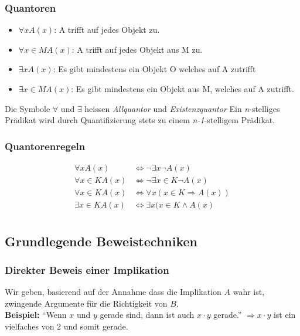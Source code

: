 \subsubsection{Quantoren}
\begin{minipage}{0.9\linewidth}
\begin{itemize}
 \item $\forall xA (x)$: A trifft auf jedes Objekt zu.
 \item $\forall x \in M A(x)$: A trifft auf jedes Objekt aus M zu.
 \item $\exists x A(x)$: Es gibt mindestens ein Objekt O welches auf A zutrifft
 \item $\exists x \in M A(x)$: Es gibt mindestens ein Objekt aus M, welches auf A zutrifft.
\end{itemize}
Die Symbole $\forall$ und $\exists$ heissen \textit{Allquantor} und \textit{Existenzquantor}
Ein \textit{n}-stelliges Prädikat wird durch Quantifizierung stets zu einem \textit{n-1}-stelligem Prädikat.
\end{minipage}

\subsubsection{Quantorenregeln}
\begin{minipage}{0.9\linewidth}
\begin{align*}
 \forall x A(x) &\Leftrightarrow \neg\exists x \neg A(x) \\
 \forall x \in K A(x) &\Leftrightarrow \neg\exists x \in K \neg A(x) \\
 \forall x \in K A(x) &\Leftrightarrow \forall x(x\in K \Rightarrow A(x)) \\
 \exists x \in K A(x) &\Leftrightarrow \exists x (x \in K \land A(x) \\
\end{align*}
\end{minipage}

\subsection{Grundlegende Beweistechniken}
	
\subsubsection{Direkter Beweis einer Implikation}
\begin{minipage}{0.9\linewidth}
Wir geben, basierend auf der Annahme dass die Implikation $A$ wahr ist, zwingende Argumente für die Richtigkeit von $B$.\\
\textbf{Beispiel:} ``Wenn $x$ und $y$ gerade sind, dann ist auch $x \cdot y$ gerade.''
$\Rightarrow x \cdot y$ ist ein vielfaches von 2 und somit gerade.
\end{minipage}
	
